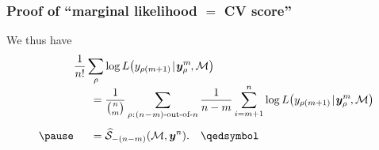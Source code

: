 \documentclass[18pt]{beamer}
\newcommand{\defineTightSpacing}{%
	\setlength{\abovedisplayskip}{.25\baselineskip}%
	\setlength{\belowdisplayskip}{.25\baselineskip}%
}
\newcommand{\given}{\thinnerspace | \thinnerspace}
\newcommand{\spacedColon}{\mkern .5mu : \mkern 1mu}
\newcommand{\thinnerspace}{\mskip.5\thinmuskip}
\newcommand{\negthinnerspace}{\mskip-.5\thinmuskip}
\newcommand{\likelihood}{L}
\newcommand{\by}{\bm{y}}
\newcommand{\score}{\mathcal{S}}
\newcommand{\modelSymbol}{\mathcal{M}}
\newcommand{\permutation}{\rho}
\newcommand{\trainingSize}{m}
\newcommand{\testSampleIndex}{i}
\begin{document}
\begin{frame}
\frametitle{Proof of ``marginal likelihood $=$ {\large CV} score''}
We thus have
\begin{equation*} %
\begin{aligned}
&\frac{1}{n!} \sum_\permutation \log \likelihood\!\left(y_{\permutation(\trainingSize + 1)} \given \by_\permutation^\trainingSize\negthinnerspace, \modelSymbol \right) \\[-.25\baselineskip]
&\hspace*{1.5em}= \frac{1}{{n \choose \trainingSize}} \sum_{\permutation \spacedColon \text{$(n\!-\!\trainingSize)$-out-of-$n$}} 
	\frac{1}{n - \trainingSize} \sum_{\testSampleIndex = \trainingSize + 1}^n
		\log \likelihood\!\left(y_{\permutation(\trainingSize + 1)} \given \by_\permutation^\trainingSize\negthinnerspace, \modelSymbol \right) \\[.25\baselineskip]
\pause
&\hspace*{1.5em}= \widehat{\score}_{-(n - \trainingSize)}(\modelSymbol, \by^n).  \quad \qedsymbol
\end{aligned}
\end{equation*}
\end{frame}


\end{document}
